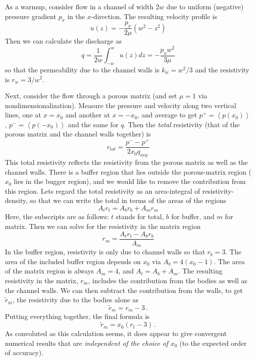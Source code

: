 \documentclass[11pt]{article}
\begin{document}
As a warmup, consider flow in a channel of width $2w$ due to uniform (negative) pressure gradient $p_x$ in the $x$-direction. The resulting velocity profile is
\begin{equation}
u(z) = -\frac{p_x}{2 \mu} (w^2 - z^2)
\end{equation}
Then we can calculate the discharge as
\begin{equation}
q = \frac{1}{2w} \int_{-w}^{w} u(z) dz = - \frac{ p_x w^2}{3 \mu} 
\end{equation}
so that the permeability due to the channel walls is $k_w = w^2/3$ and the resistivity is $r_w = 3/w^2$.

Next, consider the flow through a porous matrix (and set $\mu=1$ via nondimensionalization). Measure the pressure and velocity along two vertical lines, one at $x = x_0$ and another at $x = -x_0$, and average to get $p^+ = \left< p(x_0) \right>$, $p^- = \left<p(-x_0) \right>$ and the same for $q$. Then the {\em total} resistivity (that of the porous matrix and the channel walls together) is 
\begin{equation}
r_{tot} = \frac{p^- - p^+}{2 x_0 q_{avg}}
\end{equation}
This total resistivity reflects the resistivity from the porous matrix as well as the channel walls. There is a buffer region that lies outside the porous-matrix region ($x_0$ lies in the bugger region), and we would like to remove the contribution from this region. Lets regard the total resistivity as an area-integral of resistivity-density, so that we can write the total in terms of the areas of the regions
\begin{equation}
A_{t} r_{t} = A_{b} r_{b} + A_{m} r_{m}
\end{equation}
Here, the subscripts are as follows: $t$ stands for total, $b$ for buffer, and $m$ for matrix. Then we can solve for the resistivity in the matrix region
\begin{equation}
r_m = \frac{A_t r_t - A_b r_b}{A_m}
\end{equation}
In the buffer region, resistivity is only due to channel walls so that $r_b = 3$. The area of the included buffer region depends on $x_0$ via $A_b = 4(x_0 - 1)$. The area of the matrix region is always $A_m = 4$, and $A_t = A_b + A_m$. The resulting resistivity in the matrix, $r_m$, includes the contribution from the bodies as well as the channel walls. We can then subtract the contribution from the walls, to get $\tilde{r}_m$, the resistivity due to the bodies alone as
\begin{equation}
\tilde{r}_m = r_m - 3 \, .
\end{equation}
Putting everything together, the final formula is
\begin{equation}
\tilde{r}_m = x_0 (r_t - 3) \, .
\end{equation}
As convoluted as this calculation seems, it does appear to give convergent numerical results that are {\em independent of the choice of $x_0$} (to the expected order of accuracy).
\end{document}
